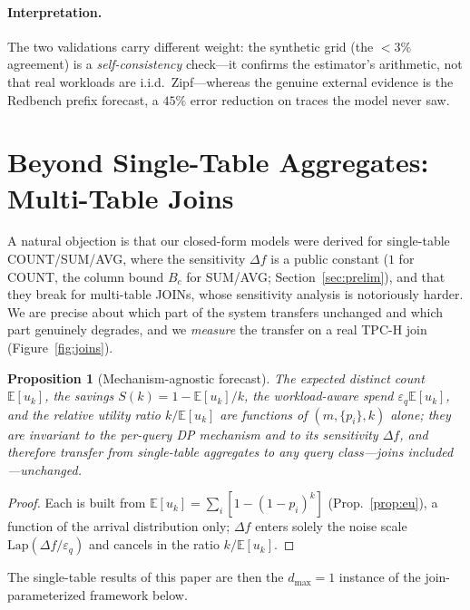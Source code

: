 \documentclass[sigconf,nonacm]{acmart}
\newcommand{\eps}{\varepsilon}
\newcommand{\E}{\mathbb{E}}
\newcommand{\Lap}{\mathrm{Lap}}
\newtheorem{prop}{Proposition}
\begin{document}
\paragraph{Interpretation.}
The two validations carry different weight: the synthetic grid (the $<3\%$ agreement) is a \emph{self-consistency} check---it confirms the estimator's arithmetic, not that real workloads are i.i.d.\ Zipf---whereas the genuine external evidence is the Redbench prefix forecast, a $45\%$ error reduction on traces the model never saw.

\section{Beyond Single-Table Aggregates: Multi-Table Joins}
\label{sec:joins}

A natural objection is that our closed-form models were derived for single-table COUNT/SUM/AVG, where the sensitivity $\Delta f$ is a public constant ($1$ for COUNT, the column bound $B_c$ for SUM/AVG; Section~\ref{sec:prelim}), and that they break for multi-table JOINs, whose sensitivity analysis is notoriously harder. We are precise about which part of the system transfers unchanged and which part genuinely degrades, and we \emph{measure} the transfer on a real TPC-H join (Figure~\ref{fig:joins}).

\begin{prop}[Mechanism-agnostic forecast]
\label{prop:agnostic}
The expected distinct count $\E[u_k]$, the savings $S(k)=1-\E[u_k]/k$, the workload-aware spend $\eps_q\E[u_k]$, and the relative utility ratio $k/\E[u_k]$ are functions of $(m,\{p_i\},k)$ alone; they are invariant to the per-query DP mechanism and to its sensitivity $\Delta f$, and therefore transfer from single-table aggregates to any query class---joins included---unchanged.
\end{prop}
\begin{proof}
Each is built from $\E[u_k]=\sum_i[1-(1-p_i)^k]$ (Prop.~\ref{prop:eu}), a function of the arrival distribution only; $\Delta f$ enters solely the noise scale $\Lap(\Delta f/\eps_q)$ and cancels in the ratio $k/\E[u_k]$. \end{proof}

\noindent The single-table results of this paper are then the $d_{\max}{=}1$ instance of the join-parameterized framework below.
\end{document}
